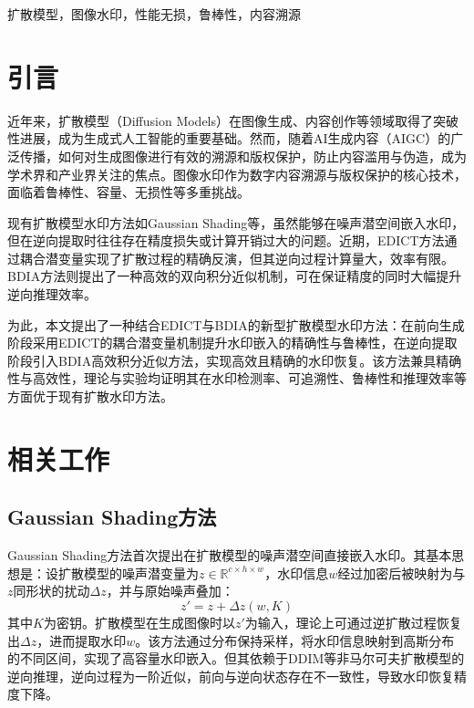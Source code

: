 \documentclass[conference]{IEEEtran}
\begin{document}
\begin{IEEEkeywords}
扩散模型，图像水印，性能无损，鲁棒性，内容溯源
\end{IEEEkeywords}

\section{引言}
近年来，扩散模型（Diffusion Models）在图像生成、内容创作等领域取得了突破性进展，成为生成式人工智能的重要基础。然而，随着AI生成内容（AIGC）的广泛传播，如何对生成图像进行有效的溯源和版权保护，防止内容滥用与伪造，成为学术界和产业界关注的焦点。图像水印作为数字内容溯源与版权保护的核心技术，面临着鲁棒性、容量、无损性等多重挑战。

现有扩散模型水印方法如Gaussian Shading\cite{Yang_2024_CVPR}等，虽然能够在噪声潜空间嵌入水印，但在逆向提取时往往存在精度损失或计算开销过大的问题。近期，EDICT\cite{panthi2025watermarkingdiffusionmodelgaussian}方法通过耦合潜变量实现了扩散过程的精确反演，但其逆向过程计算量大，效率有限。BDIA\cite{zhang2024exact}方法则提出了一种高效的双向积分近似机制，可在保证精度的同时大幅提升逆向推理效率。

为此，本文提出了一种结合EDICT与BDIA的新型扩散模型水印方法：在前向生成阶段采用EDICT的耦合潜变量机制提升水印嵌入的精确性与鲁棒性，在逆向提取阶段引入BDIA高效积分近似方法，实现高效且精确的水印恢复。该方法兼具精确性与高效性，理论与实验均证明其在水印检测率、可追溯性、鲁棒性和推理效率等方面优于现有扩散水印方法。

\section{相关工作}
\subsection{Gaussian Shading方法}
Gaussian Shading方法\cite{Yang_2024_CVPR}首次提出在扩散模型的噪声潜空间直接嵌入水印。其基本思想是：设扩散模型的噪声潜变量为$z \in \mathbb{R}^{c \times h \times w}$，水印信息$w$经过加密后被映射为与$z$同形状的扰动$\Delta z$，并与原始噪声叠加：
\begin{equation}
    z' = z + \Delta z(w, K)
\end{equation}
其中$K$为密钥。扩散模型在生成图像时以$z'$为输入，理论上可通过逆扩散过程恢复出$\Delta z$，进而提取水印$w$。该方法通过分布保持采样，将水印信息映射到高斯分布的不同区间，实现了高容量水印嵌入。但其依赖于DDIM等非马尔可夫扩散模型的逆向推理，逆向过程为一阶近似，前向与逆向状态存在不一致性，导致水印恢复精度下降。
\end{document}
